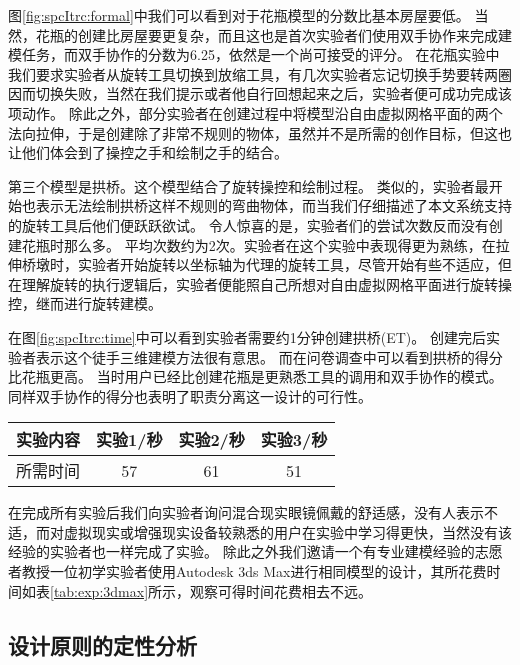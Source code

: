 图\ref{fig:spcItrc:formal}中我们可以看到对于花瓶模型的分数比基本房屋要低。
当然，花瓶的创建比房屋要更复杂，而且这也是首次实验者们使用双手协作来完成建模任务，而双手协作的分数为6.25，依然是一个尚可接受的评分。
在花瓶实验中我们要求实验者从旋转工具切换到放缩工具，有几次实验者忘记切换手势要转两圈因而切换失败，当然在我们提示或者他自行回想起来之后，实验者便可成功完成该项动作。
除此之外，部分实验者在创建过程中将模型沿自由虚拟网格平面的两个法向拉伸，于是创建除了非常不规则的物体，虽然并不是所需的创作目标，但这也让他们体会到了操控之手和绘制之手的结合。

第三个模型是拱桥。这个模型结合了旋转操控和绘制过程。
类似的，实验者最开始也表示无法绘制拱桥这样不规则的弯曲物体，而当我们仔细描述了本文系统支持的旋转工具后他们便跃跃欲试。
令人惊喜的是，实验者们的尝试次数反而没有创建花瓶时那么多。
平均次数约为2次。实验者在这个实验中表现得更为熟练，在拉伸桥墩时，实验者开始旋转以坐标轴为代理的旋转工具，尽管开始有些不适应，但在理解旋转的执行逻辑后，实验者便能照自己所想对自由虚拟网格平面进行旋转操控，继而进行旋转建模。

在图\ref{fig:spcItrc:time}中可以看到实验者需要约1分钟创建拱桥(ET)。
创建完后实验者表示这个徒手三维建模方法很有意思。
而在问卷调查中可以看到拱桥的得分比花瓶更高。
当时用户已经比创建花瓶是更熟悉工具的调用和双手协作的模式。
同样双手协作的得分也表明了职责分离这一设计的可行性。
\begin{table}[!htp]
  \centering
  \begin{minipage}[!htp]{0.6\textwidth}
  \captionstyle{\centering}
  \centering
	\begin{tabular}{@{}cccc@{}} \toprule
    实验内容 & 实验1/秒 & 实验2/秒 & 实验3/秒 \\
	\midrule
    所需时间 & 57 & 61 & 51 \\
	\bottomrule
	\end{tabular}
   \end{minipage}
\end{table}
在完成所有实验后我们向实验者询问混合现实眼镜佩戴的舒适感，没有人表示不适，而对虚拟现实或增强现实设备较熟悉的用户在实验中学习得更快，当然没有该经验的实验者也一样完成了实验。
除此之外我们邀请一个有专业建模经验的志愿者教授一位初学实验者使用Autodesk 3ds Max进行相同模型的设计，其所花费时间如表\ref{tab:exp:3dmax}所示，观察可得时间花费相去不远。

\subsection{设计原则的定性分析}

